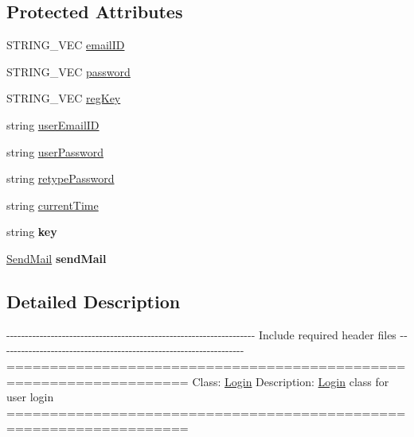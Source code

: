 \subsection*{\-Protected \-Attributes}
\begin{DoxyCompactItemize}
\item 
\-S\-T\-R\-I\-N\-G\-\_\-\-V\-E\-C \hyperlink{classLogin_abea56d6d6403f1e627294f222dd77310}{email\-I\-D}
\item 
\-S\-T\-R\-I\-N\-G\-\_\-\-V\-E\-C \hyperlink{classLogin_a39f7fd03b2b27c927c657ee73e7fcbbc}{password}
\item 
\-S\-T\-R\-I\-N\-G\-\_\-\-V\-E\-C \hyperlink{classLogin_ae22f0ed73e5248cd71a7b2167676376a}{reg\-Key}
\item 
string \hyperlink{classLogin_aa83b4706e0f0f0afc65f210ee8e4839a}{user\-Email\-I\-D}
\item 
string \hyperlink{classLogin_a9731be126468f535f161f045c95687c6}{user\-Password}
\item 
string \hyperlink{classLogin_ade36f8943aafce470ef4b8353c79b2c6}{retype\-Password}
\item 
string \hyperlink{classLogin_a624f15ecf989648b73a91743f67a6880}{current\-Time}
\item 
\hypertarget{classLogin_ab7769b44690490b43fc9046ad5958baf}{string {\bfseries key}}\label{classLogin_ab7769b44690490b43fc9046ad5958baf}

\item 
\hypertarget{classLogin_a36ff1dd294aaaf884805325cee3b83d3}{\hyperlink{classSendMail}{\-Send\-Mail} {\bfseries send\-Mail}}\label{classLogin_a36ff1dd294aaaf884805325cee3b83d3}

\end{DoxyCompactItemize}


\subsection{\-Detailed \-Description}
-\/-\/-\/-\/-\/-\/-\/-\/-\/-\/-\/-\/-\/-\/-\/-\/-\/-\/-\/-\/-\/-\/-\/-\/-\/-\/-\/-\/-\/-\/-\/-\/-\/-\/-\/-\/-\/-\/-\/-\/-\/-\/-\/-\/-\/-\/-\/-\/-\/-\/-\/-\/-\/-\/-\/-\/-\/-\/-\/-\/-\/-\/-\/-\/-\/-\/-\/ \-Include required header files -\/-\/-\/-\/-\/-\/-\/-\/-\/-\/-\/-\/-\/-\/-\/-\/-\/-\/-\/-\/-\/-\/-\/-\/-\/-\/-\/-\/-\/-\/-\/-\/-\/-\/-\/-\/-\/-\/-\/-\/-\/-\/-\/-\/-\/-\/-\/-\/-\/-\/-\/-\/-\/-\/-\/-\/-\/-\/-\/-\/-\/-\/-\/-\/-\/-\/ =================================================================== \-Class\-: \hyperlink{classLogin}{\-Login} \-Description\-: \hyperlink{classLogin}{\-Login} class for user login ===================================================================

